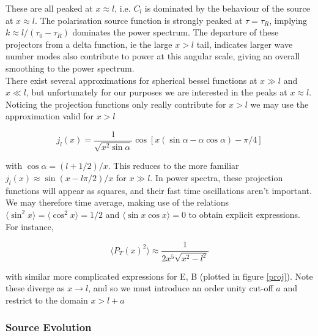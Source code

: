 \documentclass[a4paper,10pt]{article}
\begin{document}
These are all peaked at $x\approx l$, i.e. $C_l$ is dominated by the behaviour of the source at $x\approx l$. The polarisation source function is strongly peaked at $\tau=\tau_R$, implying $k\approx l/(\tau_0-\tau_R)$ dominates the power spectrum. The departure of these projectors from a delta function, ie the large $x>l$ tail, indicates larger wave number modes also contribute to power at this angular scale, giving an overall smoothing to the power spectrum.\\

There exist several approximations for spherical bessel functions at $x\gg l$ and $x\ll l$, but unfortunately for our purposes we are interested in the peaks at $x\approx l$. Noticing the projection functions only really contribute for $x>l$ we may use the approximation valid for $x>l$

\begin{equation}
j_l(x) = \frac{1}{\sqrt{x^2\sin\alpha}}\cos[x(\sin\alpha-\alpha\cos\alpha)-\pi/4]
\end{equation}

with $\cos\alpha=(l+1/2)/x$. This reduces to the more familiar $j_l(x) \approx \sin(x-l\pi/2)/x$ for $x\gg l$. In power spectra, these projection functions will appear as squares, and their fast time oscillations aren't important. We may therefore time average, making use of the relations $\langle \sin^2x \rangle = \langle \cos^2x \rangle = 1/2$ and $\langle \sin x\cos x \rangle = 0$ to obtain explicit expressions. For instance,

\begin{equation}
\langle P_T(x)^2 \rangle \approx \frac{1}{2x^5\sqrt{x^2-l^2}}
\end{equation}

with similar more complicated expressions for E, B (plotted in figure \ref{proj}). Note these diverge as $x\rightarrow l$, and so we must introduce an order unity cut-off $a$ and restrict to the domain $x>l+a$





\subsubsection{Source Evolution}
\end{document}
